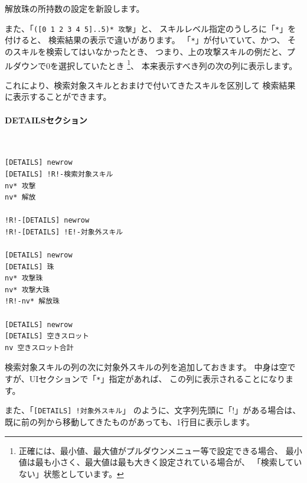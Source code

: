 \documentclass[dvipdfmx]{jsarticle}
\begin{document}
解放珠の所持数の設定を新設します。

また、「\texttt{([0 1 2 3 4 5]..5)* 攻撃}」と、
スキルレベル指定のうしろに「\texttt{*}」を付けると、
検索結果の表示で違いがあります。
%
「\texttt{*}」が付いていて、かつ、
そのスキルを検索してはいなかったとき、
つまり、上の攻撃スキルの例だと、プルダウンで0を選択していたとき%
\footnote{
正確には、最小値、最大値がプルダウンメニュー等で設定できる場合、
最小値は最も小さく、最大値は最も大きく設定されている場合が、
「検索していない」状態としています。
}、
本来表示すべき列の次の列に表示します。

これにより、検索対象スキルとおまけで付いてきたスキルを区別して
検索結果に表示することができます。

\paragraph{DETAILSセクション}~\medskip
{\footnotesize\begin{mdframed}\begin{Verbatim}[commandchars=!<>]
[DETAILS] newrow
[DETAILS] !R!-検索対象スキル
nv* 攻撃
nv* 解放

!R!-[DETAILS] newrow
!R!-[DETAILS] !E!-対象外スキル

[DETAILS] newrow
[DETAILS] 珠
nv* 攻撃珠
nv* 攻撃大珠
!R!-nv* 解放珠

[DETAILS] newrow
[DETAILS] 空きスロット
nv 空きスロット合計
\end{Verbatim}
\end{mdframed}}
\medskip

検索対象スキルの列の次に対象外スキルの列を追加しておきます。
中身は空ですが、UIセクションで「\texttt{*}」指定があれば、
この列に表示されることになります。

また、「\texttt{[DETAILS] !対象外スキル}」
のように、文字列先頭に「!」がある場合は、
既に前の列から移動してきたものがあっても、1行目に表示します。

\begin{center}
\end{center}
\end{document}
